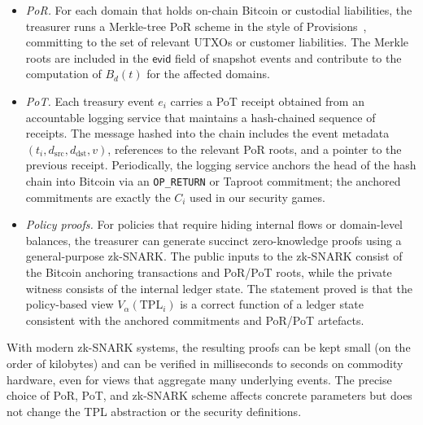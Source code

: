 \documentclass[11pt]{article}
\begin{document}
\begin{itemize}[noitemsep]
\item \emph{PoR.} For each domain that holds on-chain Bitcoin or custodial liabilities, the treasurer runs a Merkle-tree
      PoR scheme in the style of Provisions~\cite{Dagher2015}, committing to the set of relevant UTXOs or customer
      liabilities.
      The Merkle roots are included in the $\mathsf{evid}$ field of snapshot events and contribute to the computation of
      $B_d(t)$ for the affected domains.
\item \emph{PoT.} Each treasury event $e_i$ carries a PoT receipt obtained from an accountable logging service that
      maintains a hash-chained sequence of receipts.
      The message hashed into the chain includes the event metadata $(t_i,d_{\mathrm{src}},d_{\mathrm{dst}},v)$, references
      to the relevant PoR roots, and a pointer to the previous receipt.
      Periodically, the logging service anchors the head of the hash chain into Bitcoin via an \texttt{OP\_RETURN} or
      Taproot commitment; the anchored commitments are exactly the $C_i$ used in our security games.
\item \emph{Policy proofs.} For policies that require hiding internal flows or domain-level balances, the treasurer can
      generate succinct zero-knowledge proofs using a general-purpose zk-SNARK.
      The public inputs to the zk-SNARK consist of the Bitcoin anchoring transactions and PoR/PoT roots,
      while the private witness consists of the internal ledger state.
      The statement proved is that the policy-based view $V_\alpha(\mathrm{TPL}_i)$ is a correct function of a ledger
      state consistent with the anchored commitments and PoR/PoT artefacts.
\end{itemize}

With modern zk-SNARK systems, the resulting proofs can be kept small (on the order of kilobytes) and can be verified in
milliseconds to seconds on commodity hardware, even for views that aggregate many underlying events.
The precise choice of PoR, PoT, and zk-SNARK scheme affects concrete parameters but does not change the TPL abstraction
or the security definitions.
\end{document}
